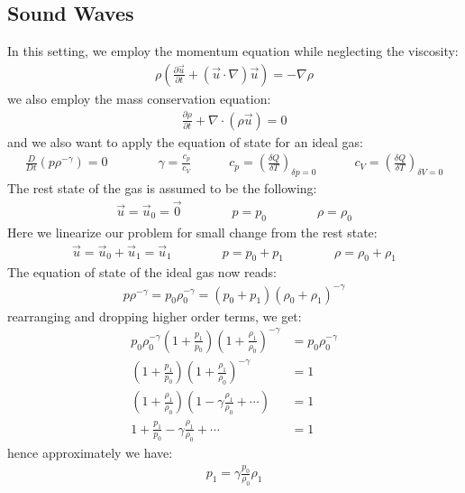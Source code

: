 \documentclass[11pt]{book}
\theoremstyle{break}
\theoremstyle{break}
\begin{document}
\hfill\break
\subsection{Sound Waves}
In this setting, we employ the momentum equation while neglecting the viscosity:
\begin{align}
\rho\left( \frac{\partial \vec{u}}{\partial t} + (\vec{u}\cdot \nabla )\vec{u}\right) = -\nabla \rho
\end{align}
we also employ the mass conservation equation:
\begin{align}
\frac{\partial \rho}{\partial t} + \nabla \cdot (\rho \vec{u}) = 0
\end{align}
and we also want to apply the equation of state for an ideal gas:
\begin{align*}
\frac{D}{Dt}(p \rho^{-\gamma}) = 0 \qquad\qquad \gamma = \frac{c_p}{c_V}\qquad\quad c_p = \left( \frac{\delta Q}{\delta T}\right)_{\delta p=0} \qquad\quad c_V = \left( \frac{\delta Q}{\delta T}\right)_{\delta V = 0}
\end{align*}
The rest state of the gas is assumed to be the following:
\begin{align*}
\vec{u} = \vec{u}_0 = \vec{0} \qquad\qquad p=p_0 \qquad\qquad \rho = \rho_0
\end{align*}
Here we linearize our problem for small change from the rest state:
\begin{align*}
\vec{u} = \vec{u}_0 + \vec{u}_1 = \vec{u}_1\qquad\qquad p = p_0+p_1 \qquad\qquad \rho = \rho_0 + \rho_1
\end{align*}
The equation of state of the ideal gas now reads:
\begin{align*}
p\rho^{-\gamma} = p_0 \rho_0^{-\gamma} = (p_0+p_1)(\rho_0+\rho_1)^{-\gamma}
\end{align*}
rearranging and dropping higher order terms, we get:
\begin{align*}
p_0 \rho_0^{-\gamma}\left(1+\frac{p_1}{p_0}\right)\left( 1+ \frac{\rho_1}{\rho_0}\right)^{-\gamma} &= p_0\rho_0^{-\gamma}\\
\left(1+\frac{p_1}{p_0}\right)\left( 1+ \frac{\rho_1}{\rho_0}\right)^{-\gamma} &= 1\\
\left(1+ \frac{\rho_1}{\rho_0} \right)\left( 1- \gamma \frac{\rho_1}{\rho_0}+\cdots\right)&= 1\\
1+ \frac{p_1}{p_0} - \gamma \frac{\rho_1}{\rho_0}+\cdots &= 1
\end{align*}
hence approximately we have:
\begin{align}
p_1 = \gamma \frac{p_0}{\rho_0}\rho_1
\end{align}
\end{document}
